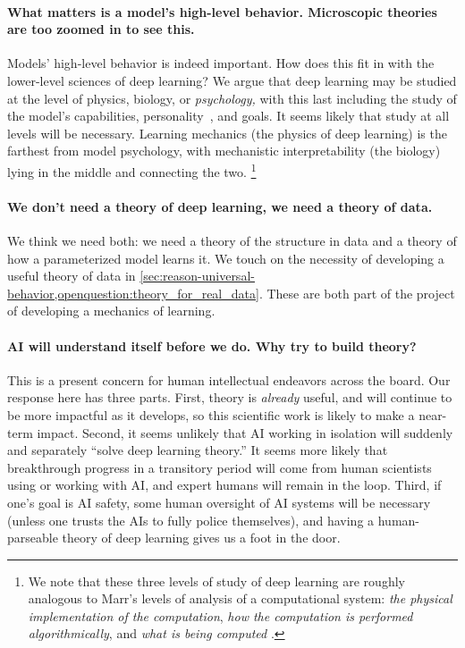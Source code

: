 \paragraph{What matters is a model's high-level behavior. Microscopic theories are too zoomed in to see this.}
Models' high-level behavior is indeed important.
How does this fit in with the lower-level sciences of deep learning?
We argue that deep learning may be studied at the level of physics, biology, or \textit{psychology,} with this last including the study of the model's capabilities, personality~\citep{betley2026training}, and goals.
It seems likely that study at all levels will be necessary.
Learning mechanics (the physics of deep learning) is the farthest from model psychology, with mechanistic interpretability (the biology) lying in the middle and connecting the two.%
\footnote{We note that these three levels of study of deep learning are roughly analogous to Marr's levels of analysis of a computational system: \textit{the physical implementation of the computation}, \textit{how the computation is performed algorithmically}, and \textit{what is being computed} \citep{marr2010vision}.}


\paragraph{We don't need a theory of deep learning, we need a theory of data.}
We think we need both: we need a theory of the structure in data and a theory of how a parameterized model learns it.
We touch on the necessity of developing a useful theory of data in \cref{sec:reason-universal-behavior,openquestion:theory_for_real_data}.
These are both part of the project of developing a mechanics of learning.

\paragraph{AI will understand itself before we do. Why try to build theory?}
This is a present concern for human intellectual endeavors across the board.
Our response here has three parts.
First, theory is \textit{already} useful, and will continue to be more impactful as it develops, so this scientific work is likely to make a near-term impact.
Second, it seems unlikely that AI working in isolation will suddenly and separately ``solve deep learning theory.''
It seems more likely that breakthrough progress in a transitory period will come from human scientists using or working with AI, and expert humans will remain in the loop.
Third, if one's goal is AI safety, some human oversight of AI systems will be necessary (unless one trusts the AIs to fully police themselves), and having a human-parseable theory of deep learning gives us a foot in the door.
